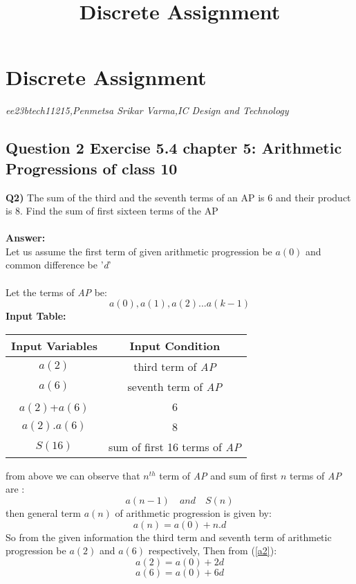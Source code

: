 \documentclass{article}
\title{Discrete Assignment}
\begin{document}
\section*{Discrete Assignment}
\textit{ee23btech11215,Penmetsa Srikar Varma,IC Design and Technology}
\subsection*{Question 2 Exercise 5.4 chapter 5: Arithmetic Progressions of class 10}
\textbf{Q2)} The sum of the third and the seventh terms of an AP is 6 and their product is 8. Find the sum of first sixteen terms of the AP\\
\\ \textbf{Answer:\\}
Let us assume the first term of given arithmetic progression be $a(0)$ and common difference be '\textit{d}'\\
\\Let the terms of \textit{AP} be:
$$a(0),a(1),a(2)...a(k-1)$$
\textbf{Input Table:}\\
\begin{center}
\begin{tabular}{|c|c|}  
\hline
     Input Variables & Input Condition \\
\hline
     $a(2)$ & third term of \textit{AP}\\
\hline
     $a(6)$ & seventh term of \textit{AP}\\
\hline
     $a(2)$+$a(6)$ & 6 \\
\hline
     $a(2).a(6)$ & 8 \\
\hline
     $S(16)$ & sum of first 16 terms of \textit{AP}\\
\hline
\end{tabular}
\end{center}
from above we can observe that $n^{th}$ term of \textit{AP} and sum of first $n$ terms of \textit{AP} are :
\begin{equation}
\label{a1}
a(n-1)\quad and\quad S(n)
\end{equation}
then general term $a(n)$ of arithmetic progression is given by:
\begin{equation}
\label{a2}
a(n)=a(0)+n.d
\end{equation}
So from the given information the third term and seventh term of arithmetic progression be $a(2)$ and $a(6)$ respectively,
Then from (\ref{a2}):
\begin{equation}
\label{a3}
a(2) = a(0)+2d
\end{equation}
\begin{equation}
\label{a4}
a(6) = a(0)+6d
\end{equation} 
\end{document}
